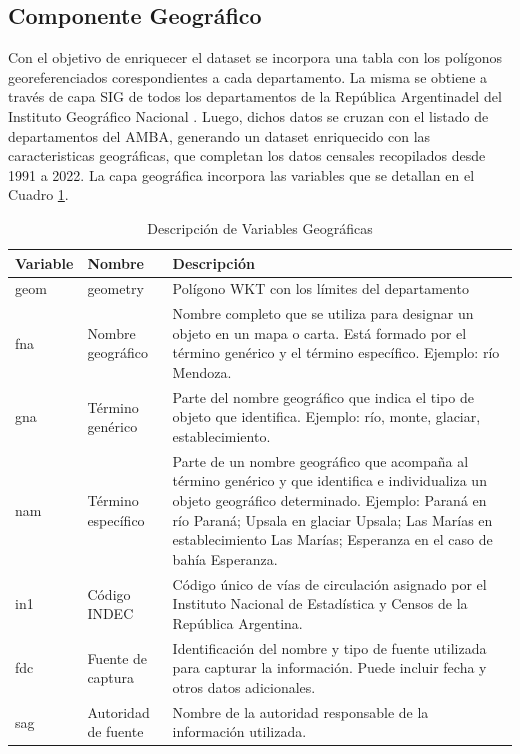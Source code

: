 \documentclass{article}
\theoremstyle{mytheoremstyle}
\theoremstyle{mytheoremstyle}
\theoremstyle{myproblemstyle}
\begin{document}
\subsection{Componente Geográfico }
Con el objetivo de enriquecer el dataset se incorpora una tabla con los polígonos georeferenciados corespondientes a cada departamento.
 La misma se obtiene a través de capa SIG de todos los departamentos de la República Argentinadel del Instituto Geográfico Nacional  . 
Luego, dichos datos se cruzan con el listado de departamentos del AMBA, generando un dataset enriquecido con las caracteristicas geográficas, que completan 
los datos censales recopilados desde 1991 a 2022. La capa geográfica incorpora las variables que se detallan en el Cuadro \ref{tab:geo.depto}.
\begin{table}[htbp]
    \centering
    \begin{tabular}{|l|l|p{8cm}|}
        \hline
        \textbf{Variable} & \textbf{Nombre} & \textbf{Descripción} \\
        \hline
        geom & geometry & Polígono WKT con los límites del departamento \\
        fna & Nombre geográfico & Nombre completo que se utiliza para designar un objeto en un mapa o carta. Está formado por el término genérico y el término específico. Ejemplo: río Mendoza. \\
        gna & Término genérico & Parte del nombre geográfico que indica el tipo de objeto que identifica. Ejemplo: río, monte, glaciar, establecimiento. \\
        nam & Término específico & Parte de un nombre geográfico que acompaña al término genérico y que identifica e individualiza un objeto geográfico determinado. Ejemplo: Paraná en río Paraná; Upsala en glaciar Upsala; Las Marías en establecimiento Las Marías; Esperanza en el caso de bahía Esperanza. \\
        in1 & Código INDEC & Código único de vías de circulación asignado por el Instituto Nacional de Estadística y Censos de la República Argentina. \\
        fdc & Fuente de captura & Identificación del nombre y tipo de fuente utilizada para capturar la información. Puede incluir fecha y otros datos adicionales. \\
        sag & Autoridad de fuente & Nombre de la autoridad responsable de la información utilizada. \\
        \hline
    \end{tabular}
  \caption{Descripción de Variables Geográficas}
    \label{tab:geo.depto}
\end{table}
\end{document}
